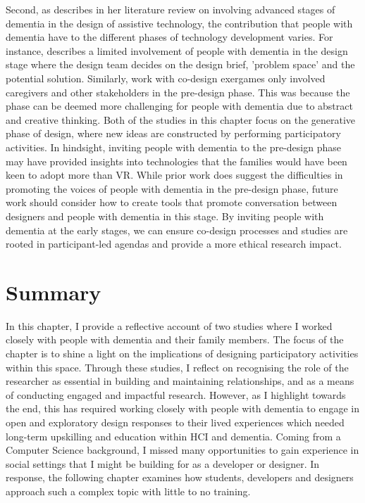 Second, as \cite{suijkerbuijk_active_2019} describes in her literature review on involving advanced stages of dementia in the design of assistive technology, the contribution that people with dementia have to the different phases of technology development varies. For instance, \cite{rodgers2015designing} describes a limited involvement of people with dementia in the design stage where the design team decides on the design brief, 'problem space' and the potential solution. Similarly, \cite{unbehaun_facilitating_2018} work with co-design exergames only involved caregivers and other stakeholders in the pre-design phase. This was because the phase can be deemed more challenging for people with dementia due to abstract and creative thinking. Both of the studies in this chapter focus on the generative phase of design, where new ideas are constructed by performing participatory activities. In hindsight, inviting people with dementia to the pre-design phase may have provided insights into technologies that the families would have been keen to adopt more than VR. While prior work does suggest the difficulties in promoting the voices of people with dementia in the pre-design phase, future work should consider how to create tools that promote conversation between designers and people with dementia in this stage. By inviting people with dementia at the early stages, we can ensure co-design processes and studies are rooted in participant-led agendas and provide a more ethical research impact.


\section{Summary}
\label{C4:Summary}
In this chapter, I provide a reflective account of two studies where I worked closely with people with dementia and their family members. The focus of the chapter is to shine a light on the implications of designing participatory activities within this space. Through these studies, I reflect on recognising the role of the researcher as essential in building and maintaining relationships, and as a means of conducting engaged and impactful research. However, as I highlight towards the end, this has required working closely with people with dementia to engage in open and exploratory design responses to their lived experiences which needed long-term upskilling and education within HCI and dementia. Coming from a Computer Science background, I missed many opportunities to gain experience in social settings that I might be building for as a developer or designer. In response, the following chapter examines how students, developers and designers approach such a complex topic with little to no training. 

